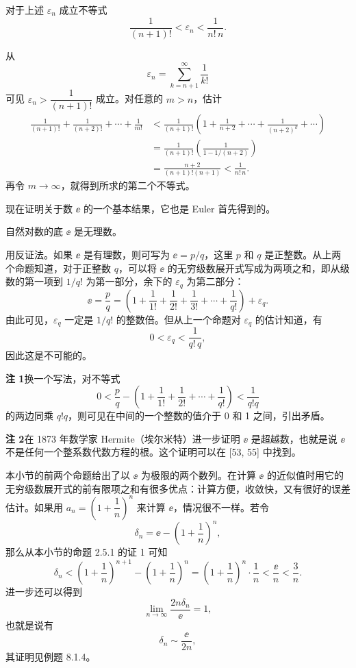 \begin{xproposition}[2.5.4]
对于上述 $\varepsilon_n$ 成立不等式
\[
  \frac1{(n+1)!}<\varepsilon_n<\frac1{n!\,n}.
\]
\end{xproposition}
\begin{xproof}
从
\[
  \varepsilon_n=\sum_{k=n+1}^{\infty}\frac1{k!}
\]
可见 $\varepsilon_n>\dfrac1{(n+1)!}$ 成立。对任意的 $m>n$，估计
\begin{align*}
  \frac1{(n+1)!}+\frac1{(n+2)!}+\cdots+\frac1{m!}
  &<\frac1{(n+1)!}\left(1+\frac1{n+2}+\cdots+\frac1{(n+2)^k}+\cdots\right)\\
  &=\frac1{(n+1)!}\left(\frac1{1-1/(n+2)}\right)\\
  &=\frac{n+2}{(n+1)!(n+1)}<\frac1{n!\,n}.
\end{align*}
再令 $m\to\infty$，就得到所求的第二个不等式。
\end{xproof}

现在证明关于数 $\ee$ 的一个基本结果，它也是 Euler 首先得到的。

\begin{xproposition}[2.5.5]
自然对数的底 $\ee$ 是无理数。
\end{xproposition}
\begin{xproof}
用反证法。如果 $\ee$ 是有理数，则可写为 $\ee=p/q$，这里 $p$ 和 $q$ 是正整数。从上两个命题知道，对于正整数 $q$，可以将 $\ee$ 的无穷级数展开式写成为两项之和，即从级数的第一项到 $1/q!$ 为第一部分，余下的 $\varepsilon_q$ 为第二部分：
\begin{equation}
  \ee=\frac pq
  =\left(1+\frac1{1!}+\frac1{2!}+\frac1{3!}+\cdots+\frac1{q!}\right)+\varepsilon_q.
  \tag{2.14}
  \label{eq:2.14}
\end{equation}
由此可见，$\varepsilon_q$ 一定是 $1/q!$ 的整数倍。但从上一个命题对 $\varepsilon_q$ 的估计知道，有
\[
  0<\varepsilon_q<\frac1{q!\,q},
\]
因此这是不可能的。
\end{xproof}

\begin{xremark}
\textbf{注 1}\quad 换一个写法，对不等式
\[
  0<\frac pq-\left(1+\frac1{1!}+\frac1{2!}+\cdots+\frac1{q!}\right)<\frac1{q!q}
\]
的两边同乘 $q!q$，则可见在中间的一个整数的值介于 0 和 1 之间，引出矛盾。

\textbf{注 2}\quad 在 1873 年数学家 Hermite（埃尔米特）进一步证明 $\ee$ 是超越数，也就是说 $\ee$ 不是任何一个整系数代数方程的根。这个证明可以在 [53, 55] 中找到。
\end{xremark}

本小节的前两个命题给出了以 $\ee$ 为极限的两个数列。在计算 $\ee$ 的近似值时用它的无穷级数展开式的前有限项之和有很多优点：计算方便，收敛快，又有很好的误差估计。如果用 $a_n=\left(1+\dfrac1n\right)^n$ 来计算 $\ee$，情况很不一样。若令
\[
  \delta_n=\ee-\left(1+\frac1n\right)^n,
\]
那么从本小节的命题 2.5.1 的证 1 可知
\[
  \delta_n<\left(1+\frac1n\right)^{n+1}-\left(1+\frac1n\right)^n
  =\left(1+\frac1n\right)^n\cdot\frac1n<\frac\ee n<\frac3n.
\]
进一步还可以得到
\[
  \lim_{n\to\infty}\frac{2n\delta_n}{\ee}=1,
\]
也就是说有
\begin{equation}
  \delta_n\sim\frac\ee{2n},
  \tag{2.15}
  \label{eq:2.15}
\end{equation}
其证明见例题 8.1.4。

